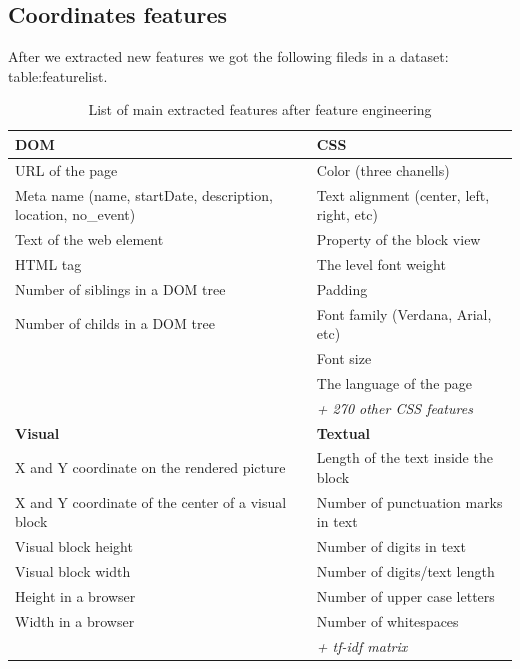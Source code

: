 \subsection{Coordinates features}

After we extracted new features we got the following fileds in a dataset: {table:featurelist}.

\begin{table}[h]
\begin{center}
{\renewcommand{\arraystretch}{1.2}
\begin{tabular}{| p{6cm} | p{6cm} |}
\hline
\textbf{DOM}   &   \textbf{CSS}\\
\hline
URL of the page    &    Color (three chanells)\\
Meta name (name, startDate, description, location, no\_event)    &    Text alignment (center, left, right, etc)    \\
Text of the web element    &    Property of the block view    \\
HTML tag    &    The level font weight    \\
Number of siblings in a DOM tree    &    Padding    \\
Number of childs in a DOM tree    &    Font family (Verdana, Arial, etc)    \\
    &    Font size \\
    &    The language of the page \\
    
    &    \textit{+ 270 other CSS features} \\
\hline
\textbf{Visual}   &   \textbf{Textual}  \\
\hline
X and Y coordinate on the rendered picture    &    Length of the text inside the block    \\
X and Y coordinate of the center of a visual block    &    Number of punctuation marks in text    \\
Visual block height     &    Number of digits in text    \\
Visual block width        &    Number of digits/text length    \\
Height in a browser     &    Number of upper case letters    \\
Width in a browser     &    Number of whitespaces    \\

     &    \textit{+ tf-idf matrix}    \\
\hline
\end{tabular}}
\caption{List of main extracted features after feature engineering}
\label{table:featurelist}
\end{center}
\end{table}    
    
